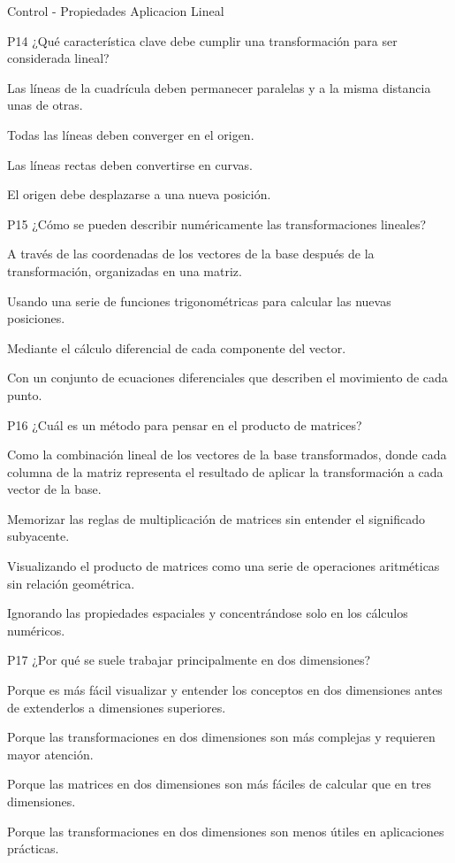 \documentclass[a4,11pt]{aleph-notas}
\begin{document}
\begin{quiz}{Control - Propiedades Aplicacion Lineal}
\begin{multi}[]%
    {P14}     
    ¿Qué característica clave debe cumplir una transformación para ser considerada lineal?     
    \item* Las líneas de la cuadrícula deben permanecer paralelas y a la misma distancia unas de otras.     
    \item Todas las líneas deben converger en el origen.     
    \item Las líneas rectas deben convertirse en curvas.     
    \item El origen debe desplazarse a una nueva posición.
\end{multi}

\begin{multi}[]%
    {P15}     
    ¿Cómo se pueden describir numéricamente las transformaciones lineales?     
    \item* A través de las coordenadas de los vectores de la base después de la transformación, organizadas en una matriz.     
    \item Usando una serie de funciones trigonométricas para calcular las nuevas posiciones.     
    \item Mediante el cálculo diferencial de cada componente del vector.     
    \item Con un conjunto de ecuaciones diferenciales que describen el movimiento de cada punto.
\end{multi}

\begin{multi}[]%
    {P16}     
    ¿Cuál es un método para pensar en el producto de matrices?     
    \item* Como la combinación lineal de los vectores de la base transformados, donde cada columna de la matriz representa el resultado de aplicar la transformación a cada vector de la base.     
    \item Memorizar las reglas de multiplicación de matrices sin entender el significado subyacente.     
    \item Visualizando el producto de matrices como una serie de operaciones aritméticas sin relación geométrica.     
    \item Ignorando las propiedades espaciales y concentrándose solo en los cálculos numéricos.
\end{multi}

\begin{multi}[]%
    {P17}     
    ¿Por qué se suele trabajar principalmente en dos dimensiones?     
    \item* Porque es más fácil visualizar y entender los conceptos en dos dimensiones antes de extenderlos a dimensiones superiores.     
    \item Porque las transformaciones en dos dimensiones son más complejas y requieren mayor atención.     
    \item Porque las matrices en dos dimensiones son más fáciles de calcular que en tres dimensiones.     
    \item Porque las transformaciones en dos dimensiones son menos útiles en aplicaciones prácticas.
\end{multi}


\end{quiz}
\end{document}

